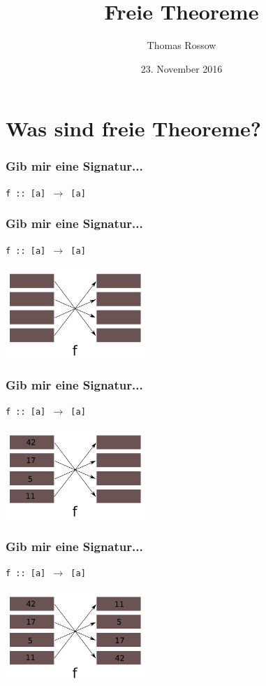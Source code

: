 \documentclass{beamer}
\title{Freie Theoreme}
\author{Thomas Rossow}
\date{23. November 2016}
\begin{document}
\maketitle
\frame{\tableofcontents}

\section{Was sind freie Theoreme?}

\begin{frame}
\frametitle{Gib mir eine Signatur...}
\begin{center}
\texttt{f :: [a] $\rightarrow$ [a]}
\end{center}
\end{frame}

\begin{frame}
\frametitle{Gib mir eine Signatur...}
\begin{center}
\texttt{f :: [a] $\rightarrow$ [a]}

\includegraphics[width=200px]{list-order-blank}
\end{center}
\end{frame}

\begin{frame}
\frametitle{Gib mir eine Signatur...}
\begin{center}
\texttt{f :: [a] $\rightarrow$ [a]}

\includegraphics[width=200px]{list-order-onlyleft}
\end{center}
\end{frame}

\begin{frame}
\begin{center}
\frametitle{Gib mir eine Signatur...}
\texttt{f :: [a] $\rightarrow$ [a]}

\includegraphics[width=200px]{list-order}
\end{center}
\end{frame}
\end{document}
